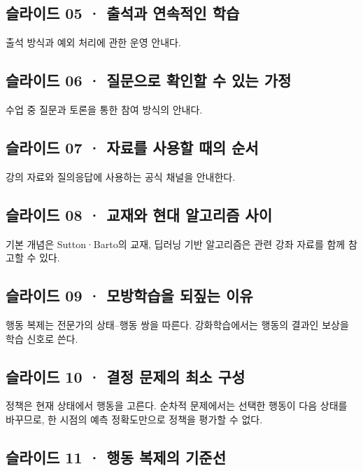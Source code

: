 \documentclass[11pt,a4paper]{article}
\begin{document}
\subsection{슬라이드 05 · 출석과 연속적인 학습}

출석 방식과 예외 처리에 관한 운영 안내다.\par

\subsection{슬라이드 06 · 질문으로 확인할 수 있는 가정}

수업 중 질문과 토론을 통한 참여 방식의 안내다.\par

\subsection{슬라이드 07 · 자료를 사용할 때의 순서}

강의 자료와 질의응답에 사용하는 공식 채널을 안내한다.\par

\subsection{슬라이드 08 · 교재와 현대 알고리즘 사이}

기본 개념은 Sutton·Barto의 교재, 딥러닝 기반 알고리즘은 관련 강좌 자료를 함께 참고할 수 있다.\par

\subsection{슬라이드 09 · 모방학습을 되짚는 이유}

행동 복제는 전문가의 상태–행동 쌍을 따른다. 강화학습에서는 행동의 결과인 보상을 학습 신호로 쓴다.\par

\subsection{슬라이드 10 · 결정 문제의 최소 구성}

정책은 현재 상태에서 행동을 고른다. 순차적 문제에서는 선택한 행동이 다음 상태를 바꾸므로, 한 시점의 예측 정확도만으로 정책을 평가할 수 없다.\par

\subsection{슬라이드 11 · 행동 복제의 기준선}
\end{document}
